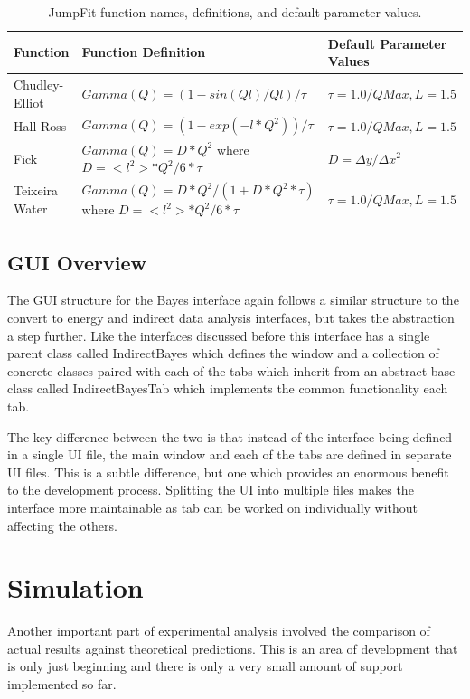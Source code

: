 \documentclass[paper=a4, fontsize=11pt]{scrartcl}	%
\numberwithin{equation}{section}															%
\numberwithin{figure}{section}																%
\numberwithin{table}{section}																%
\begin{document}
\begin{table}[H]
\begin{center}
\begin{tabular}{ l l l}
Function & Function Definition & Default Parameter Values \\ \hline
Chudley-Elliot &  $Gamma(Q) = (1 - sin(Ql)/Ql)/\tau$ & $\tau = 1.0/QMax, L=1.5$\\ \hline
Hall-Ross & $ Gamma(Q) = (1-exp(-l*Q^2))/\tau$ & $\tau = 1.0/QMax, L=1.5$ \\ \hline
Fick & \parbox{6cm}{$Gamma(Q) = D*Q^2$ \\ where $D=<l^2>*Q^2/6*\tau$} & $D = \Delta y / \Delta x^2$\\ \hline
Teixeira Water & \parbox{6cm}{$Gamma(Q) = D*Q^2/(1 + D*Q^2*\tau)$ \\ where $D=<l^2>*Q^2/6*\tau$} & $\tau = 1.0/QMax, L=1.5$ \\ \hline
\end{tabular}
\caption{JumpFit function names, definitions, and default parameter values.}
\label{table:jumpfit-functions}
\end{center}
\end{table}

\subsection{GUI Overview}
\label{subsubsec:Bayes-GUI-Overview}
The GUI structure for the Bayes interface again follows a similar structure to the convert to energy and indirect data analysis interfaces, but takes the abstraction a step further. Like the interfaces discussed before this interface has a single parent class called IndirectBayes which defines the window and a collection of concrete classes paired with each of the tabs which inherit from an abstract base class called IndirectBayesTab which implements the common functionality each tab. 

The key difference between the two is that instead of the interface being defined in a single UI file, the main window and each of the tabs are defined in separate UI files. This is a subtle difference, but one which provides an enormous benefit to the development process. Splitting the UI into multiple files makes the interface more maintainable as tab can be worked on individually without affecting the others.

\section{Simulation}
Another important part of experimental analysis involved the comparison of actual results against theoretical predictions. This is an area of development that is only just beginning and there is only a very small amount of support implemented so far.
\end{document}
